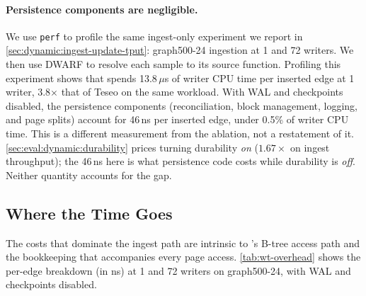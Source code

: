 \paragraph{Persistence components are negligible.}
\label{sec:wt-overhead-persistence}
We use \texttt{perf} to profile the same ingest-only experiment we report in \autoref{sec:dynamic:ingest-update-tput}: graph500-24 ingestion at 1 and 72 writers. 
We then use DWARF\cite{dwarf5standard} to resolve each sample to its \wt{} source function.
Profiling this experiment shows that \project{} spends 13.8\,$\mu$s of writer CPU time per inserted edge at 1 writer, 3.8$\times$ that of Teseo on the same workload.
With WAL and checkpoints disabled, the persistence components (reconciliation, block management, logging, and page splits) account for 46\,ns per inserted edge, under 0.5\% of writer CPU time.
This is a different measurement from the ablation, not a restatement of it.
\autoref{sec:eval:dynamic:durability} prices turning durability \emph{on} ($1.67\times$ on ingest throughput); the 46\,ns here is what persistence code costs while durability is \emph{off}.
Neither quantity accounts for the gap.

\subsection{Where the Time Goes}
\label{sec:wt-overhead-costs}

The costs that dominate the ingest path are intrinsic to \wt{}'s B-tree access path and the bookkeeping that accompanies every page access.
\autoref{tab:wt-overhead} shows the per-edge breakdown (in ns) at 1 and 72 writers on graph500-24, with WAL and checkpoints disabled.

